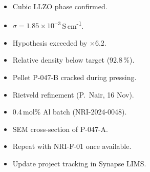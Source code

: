 \begin{tcolorbox}[notebox, title={\faChartLine\quad Analysis \& Interpretation}]
  \vspace{8pt}

  \noindent
  \begin{minipage}[t]{0.48\linewidth}
    \begin{tcolorbox}[
      enhanced,
      colback=PageTint,
      colframe=AccentGold,
      leftrule=3pt,
      rightrule=0.3pt,
      toprule=0.3pt,
      bottomrule=0.3pt,
      colbacktitle=AccentGold!20,
      coltitle=InkBlue,
      fonttitle=\bfseries\footnotesize,
      title={Key Findings},
      arc=2pt,
      left=8pt, right=8pt,
      top=6pt, bottom=6pt,
    ]
      {\small
        \begin{itemize}[leftmargin=12pt, itemsep=2pt, topsep=0pt]
          \item[\faCheck] Cubic LLZO phase confirmed.
          \item[\faCheck] $\sigma = 1.85\times10^{-3}$\,S\,cm\textsuperscript{-1}.
          \item[\faCheck] Hypothesis exceeded by $\times$6.2.
          \item[\faTimes] Relative density below target (92.8\,\%).
          \item[\faTimes] Pellet P-047-B cracked during pressing.
        \end{itemize}
      }
    \end{tcolorbox}
  \end{minipage}%
  \hfill
  \begin{minipage}[t]{0.48\linewidth}
    \begin{tcolorbox}[
      enhanced,
      colback=PageTint,
      colframe=InkBlue,
      leftrule=3pt,
      rightrule=0.3pt,
      toprule=0.3pt,
      bottomrule=0.3pt,
      colbacktitle=LightSteel,
      coltitle=InkBlue,
      fonttitle=\bfseries\footnotesize,
      title={Next Steps},
      arc=2pt,
      left=8pt, right=8pt,
      top=6pt, bottom=6pt,
    ]
      {\small
        \begin{itemize}[leftmargin=12pt, itemsep=2pt, topsep=0pt]
          \item Rietveld refinement (P.\ Nair, 16 Nov).
          \item 0.4\,mol\% Al batch (NRI-2024-0048).
          \item SEM cross-section of P-047-A.
          \item Repeat with NRI-F-01 once available.
          \item Update project tracking in Synapse LIMS.
        \end{itemize}
      }
    \end{tcolorbox}
  \end{minipage}

\end{tcolorbox}

\vspace{4pt}
\begin{tcolorbox}[sideruled, title={\faBook\quad References}]
  \renewcommand{\refname}{}
  \begingroup
    \small
    
    
  \endgroup
\end{tcolorbox}
